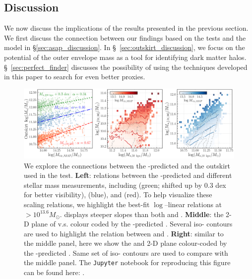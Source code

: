 \documentclass[fleqn,usenatbib,useAMS]{mnras}
\begin{document}
\begin{CJK*}{UTF8}{gbsn}
\section{Discussion}
    \label{sec:discussion}
    
    We now discuss the implications of the results presented in the previous section.
    We first discuss the connection between our findings based on the \topn{} tests  and the \asap{}
    model in \S \ref{sec:asap_discussion}.
    In \S\ \ref{sec:outskirt_discussion}, we focus on the potential of the outer envelope mass as a
    tool for identifying dark matter halos.
    \S\ \ref{sec:perfect_finder} discusses the possibility of using the techniques developed in this
    paper to search for even better \mvir{} proxies. 
    
\begin{figure}
    \centering
    \includegraphics[width=\textwidth]{figure/fig_11}
    \caption{
        We explore the connections between the \asap{}-predicted \mvir{} and the outskirt 
        \mstar{} used in the \topn{} test. 
        \textbf{Left}: relations between the \asap{}-predicted \mvir{} and different stellar mass
        measurements, including  (green; shifted up by 0.3 dex for better visibility),
         (blue), and  (red).
        To help visualize these scaling relations, we highlight the best-fit $\log$--linear 
        relations at \masap{}$> 10^{13.6} M_{\odot}$.
         displays steeper slopes than both  and .
        \textbf{Middle}: the 2-D plane of  v.s.   colour coded by the
        \asap{}-predicted \mvir{}.
        Several iso-\mvir{} contours are used to highlight the relation between \mvir{} and
        .
        \textbf{Right}: similar to the middle panel, here we show the  and
         2-D plane colour-coded by the \asap{}-predicted \mvir{}.
        Same set of iso-\mvir{} contours are used to compare with the middle panel.
        The \texttt{Jupyter} notebook for reproducing this figure can be found here:
        \href{https://github.com/dr-guangtou/jianbing/blob/master/notebooks/figure/fig12.ipynb}{\faGithub}.
    }
    \label{fig:outskirt_discussion}
\end{figure}



\end{CJK*}
\end{document}
